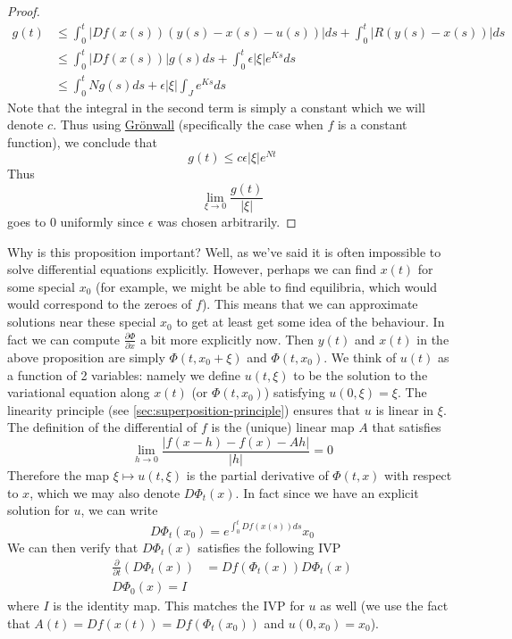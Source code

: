 \begin{proof}
    \begin{align*}
        g(t) &\leq \int_0^t |Df(x(s))(y(s) - x(s) - u(s))| ds + \int_0^t |R(y(s) - x(s))| ds\\
        &\leq \int_0^t |Df(x(s))| g(s) ds + \int_0^t \epsilon |\xi| e^{Ks} ds\\
        &\leq \int_0^t N g(s) ds + \epsilon |\xi| \int_{J} e^{Ks} ds
    \end{align*}
    Note that the integral in the second term is simply a constant which we will denote $c$. Thus using \hyperref[thm:big-gronwall]{Grönwall} (specifically the case when $f$ is a constant function), we conclude that
    $$ g(t) \leq c \epsilon |\xi| e^{Nt} $$
    Thus 
    $$ \lim_{\xi \to 0} \frac{g(t)}{|\xi|} $$
    goes to 0 uniformly since $\epsilon$ was chosen arbitrarily.    
\end{proof}
Why is this proposition important? Well, as we've said it is often impossible to solve differential equations explicitly. However, perhaps we can find $x(t)$ for some special $x_0$ (for example, we might be able to find equilibria, which would would correspond to the zeroes of $f$). This means that we can approximate solutions near these special $x_0$ to get at least get some idea of the behaviour. In fact we can compute $\frac{\partial \Phi}{\partial x}$ a bit more explicitly now. Then $y(t)$ and $x(t)$ in the above proposition are simply $\Phi(t, x_0 + \xi)$ and $\Phi(t, x_0)$. We think of $u(t)$ as a function of 2 variables: namely we define $u(t, \xi)$ to be the solution to the variational equation along $x(t)$ (or $\Phi(t, x_0)$) satisfying $u(0, \xi) = \xi$. The linearity principle (see \autoref{sec:superposition-principle}) ensures that $u$ is linear in $\xi$. The definition of the differential of $f$ is the (unique) linear map $A$ that satisfies 
$$ \lim_{h \to 0} \frac{|f(x - h) - f(x) - Ah|}{|h|} = 0 $$
Therefore the map $\xi \mapsto u(t, \xi)$ is the partial derivative of $\Phi(t, x)$ with respect to $x$, which we may also denote $D\Phi_t(x)$. In fact since we have an explicit solution for $u$, we can write
$$ D \Phi_t(x_0) = e^{\int_0^t Df(x(s)) ds} x_0 $$
We can then verify that $D\Phi_t(x)$ satisfies the following IVP
\begin{align*}
    \frac{\partial}{\partial t} (D \Phi_t (x)) &= Df(\Phi_t(x)) D\Phi_t (x)\\
    D \Phi_0 (x) = I
\end{align*}
where $I$ is the identity map. This matches the IVP for $u$ as well (we use the fact that $A(t) = Df(x(t)) = Df(\Phi_t(x_0))$ and $u(0, x_0) = x_0$).

